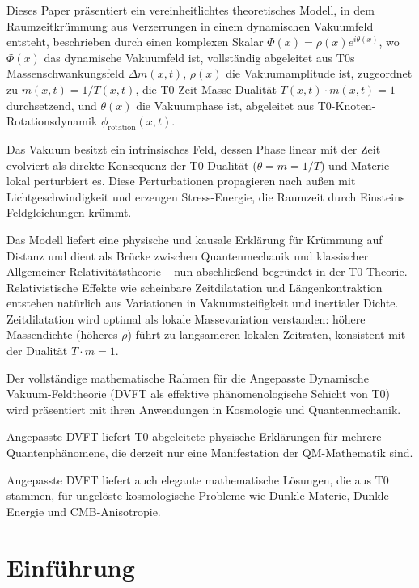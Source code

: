 \begin{t0box}[Zusammenfassung]
		Dieses Paper präsentiert ein vereinheitlichtes theoretisches Modell, in dem Raumzeitkrümmung aus Verzerrungen in einem dynamischen Vakuumfeld entsteht, beschrieben durch einen komplexen Skalar $\Phi(x)=\rho(x)e^{i\theta(x)}$, wo $\Phi(x)$ das dynamische Vakuumfeld ist, vollständig abgeleitet aus T0s Massenschwankungsfeld $\Delta m(x,t)$, $\rho(x)$ die Vakuumamplitude ist, zugeordnet zu $m(x,t) = 1/T(x,t)$, die T0-Zeit-Masse-Dualität $T(x,t) \cdot m(x,t) = 1$ durchsetzend, und $\theta(x)$ die Vakuumphase ist, abgeleitet aus T0-Knoten-Rotationsdynamik $\phi_{\text{rotation}}(x,t)$.
		
		Das Vakuum besitzt ein intrinsisches Feld, dessen Phase linear mit der Zeit evolviert als direkte Konsequenz der T0-Dualität ($\dot{\theta} = m = 1/T$) und Materie lokal perturbiert es. Diese Perturbationen propagieren nach außen mit Lichtgeschwindigkeit und erzeugen Stress-Energie, die Raumzeit durch Einsteins Feldgleichungen krümmt.
		
		Das Modell liefert eine physische und kausale Erklärung für Krümmung auf Distanz und dient als Brücke zwischen Quantenmechanik und klassischer Allgemeiner Relativitätstheorie – nun abschließend begründet in der T0-Theorie. Relativistische Effekte wie scheinbare Zeitdilatation und Längenkontraktion entstehen natürlich aus Variationen in Vakuumsteifigkeit und inertialer Dichte. Zeitdilatation wird optimal als lokale Massevariation verstanden: höhere Massendichte (höheres $\rho$) führt zu langsameren lokalen Zeitraten, konsistent mit der Dualität $T \cdot m = 1$.
		
		Der vollständige mathematische Rahmen für die Angepasste Dynamische Vakuum-Feldtheorie (DVFT als effektive phänomenologische Schicht von T0) wird präsentiert mit ihren Anwendungen in Kosmologie und Quantenmechanik.
		
		Angepasste DVFT liefert T0-abgeleitete physische Erklärungen für mehrere Quantenphänomene, die derzeit nur eine Manifestation der QM-Mathematik sind.
		
		Angepasste DVFT liefert auch elegante mathematische Lösungen, die aus T0 stammen, für ungelöste kosmologische Probleme wie Dunkle Materie, Dunkle Energie und CMB-Anisotropie.
	\end{t0box}
	
	\section{Einführung}
	

